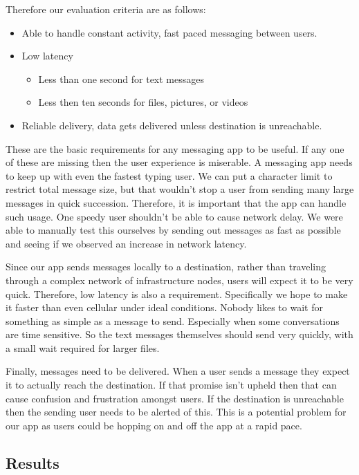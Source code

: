 \documentclass[10pt]{article}
\begin{document}
Therefore our evaluation criteria are as follows:
\begin{itemize}
    \item Able to handle constant activity, fast paced messaging between users.
    \item Low latency
          \begin{itemize}
              \item Less than one second for text messages
              \item Less then ten seconds for files, pictures, or videos
          \end{itemize}
    \item Reliable delivery, data gets delivered unless destination is unreachable.
\end{itemize}
These are the basic requirements for any messaging app to be useful. If any one of these are missing then the user experience is miserable.
A messaging app needs to keep up with even the fastest typing user. We can put a character limit to restrict total message size, but that wouldn't stop a user from sending many large messages in quick succession. Therefore, it is important that the app can handle such usage. One speedy user shouldn't be able to cause network delay. We were able to manually test this ourselves by sending out messages as fast as possible and seeing if we observed an increase in network latency.

Since our app sends messages locally to a destination, rather than traveling through a complex network of infrastructure nodes, users will expect it to be very quick. Therefore, low latency is also a requirement. Specifically we hope to make it faster than even cellular under ideal conditions. Nobody likes to wait for something as simple as a message to send. Especially when some conversations are time sensitive. So the text messages themselves should send very quickly, with a small wait required for larger files.

Finally, messages need to be delivered. When a user sends a message they expect it to actually reach the destination. If that promise isn't upheld then that can cause confusion and frustration amongst users. If the destination is unreachable then the sending user needs to be alerted of this. This is a potential problem for our app as users could be hopping on and off the app at a rapid pace.

\subsection{Results}
\end{document}
